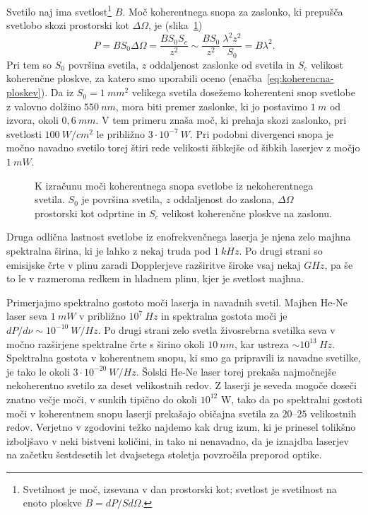 Svetilo naj ima svetlost\footnote{Svetilnost je moč, izsevana v dan 
prostorski kot; svetlost je svetilnost na enoto ploskve
$B= dP/Sd\Omega$.} $B$.  
Moč koherentnega snopa za zaslonko, ki prepušča svetlobo skozi prostorski kot 
$\Delta\Omega$, je (slika~\ref{fig:svetlost})
\begin{equation}
P=BS_{0}\Delta \Omega =\frac{BS_{0}S_{c}}{z^{2}}\sim \frac{BS_{0}}{z^{2}}\,
\frac{\lambda ^{2}z^{2}}{S_{0}}=B\lambda ^{2}.
\label{5.21}
\end{equation}
Pri tem so $S_{0}$ površina svetila, $z$ oddaljenost zaslonke od svetila in
$S_{c}$ velikost koherenčne ploskve, za katero smo uporabili oceno 
(enačba~\ref{eq:koherencna-ploskev}). Da iz $S_0=1~\si{mm}^2$ velikega svetila 
dosežemo koherenteni snop svetlobe z valovno dolžino $550~\si{nm}$, 
mora biti premer zaslonke, ki jo postavimo $1~\si{m}$ od izvora, 
okoli $0,6~\si{mm}$. V tem primeru znaša 
moč, ki prehaja skozi zaslonko, pri svetlosti $100~\si{W/cm^{2}}$ 
le približno $3\cdot10^{-7}~\si{W}$.
Pri podobni divergenci snopa je močno navadno svetilo torej štiri rede
velikosti šibkejše od šibkih laserjev z močjo $1~\si{mW}$. 
\begin{figure}[ht]
\centering
\def\svgwidth{100truemm} 

\caption{K izračunu moči koherentnega snopa svetlobe iz nekoherentnega svetila. $S_0$
je površina svetila, $z$ oddaljenost do zaslona, $\Delta \Omega$ prostorski kot odprtine
 in $S_c$ velikost koherenčne ploskve na zaslonu.}
\label{fig:svetlost}
\end{figure}

Druga odlična lastnost svetlobe iz enofrekvenčnega laserja je njena zelo majhna
spektralna širina, ki je lahko z nekaj truda pod $1~\si{kHz}$. Po drugi strani so emisijske 
črte v plinu zaradi Dopplerjeve razširitve široke vsaj nekaj $\si{GHz}$, 
pa še to le v razmeroma redkem in hladnem plinu, kjer je svetlost majhna.

Primerjajmo spektralno gostoto moči laserja in navadnih svetil. Majhen He-Ne
laser seva $1~\si{mW}$ v približno $10^{7}~\si{Hz}$ in spektralna gostota
moči je $dP/d\nu \sim 10^{-10}~\si{W/Hz}$. Po drugi strani zelo svetla 
živosrebrna svetilka seva v močno razširjene spektralne črte s širino okoli 
$10~\si{nm}$, kar ustreza $\sim 10^{13}~\si{Hz}$. 
Spektralna gostota v koherentnem snopu, ki smo ga pripravili iz
navadne svetilke, je tako le okoli $3\cdot 10^{-20}~\si{W/Hz}$. Šolski
He-Ne laser torej prekaša najmočnejše nekoherentno svetilo za deset 
velikostnih redov. Z laserji je seveda mogoče doseči znatno večje
moči, v sunkih tipično do okoli $10^{12}$ W, tako da po spektralni gostoti moči v
koherentnem snopu laserji prekašajo običajna svetila za $20$--$25$
velikostnih redov. Verjetno v zgodovini težko najdemo kak drug izum, 
ki je prinesel tolikšno izboljšavo v neki bistveni količini, in tako ni 
nenavadno, da je iznajdba laserjev na začetku šestdesetih let dvajsetega stoletja povzročila preporod optike.

